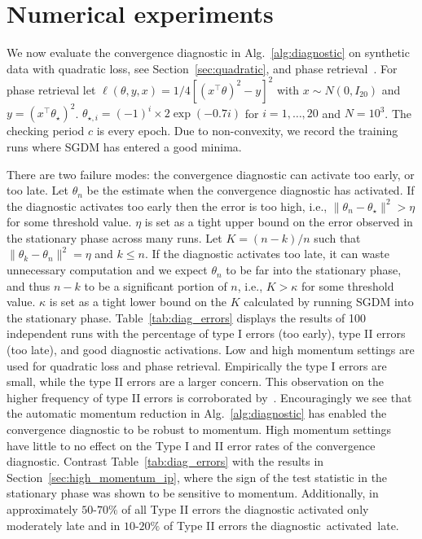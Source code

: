 \documentclass[conference]{IEEEtran}
\begin{document}
\section{Numerical experiments}\label{sec:synth-data-experiments}
We now evaluate the convergence diagnostic in Alg.~\ref{alg:diagnostic} on synthetic data with quadratic loss, see Section~\ref{sec:quadratic}, and phase retrieval~\cite{Article:Chen_MP19}.
For phase retrieval let $\ell ( \theta, y, x ) = 1/4 [ ( x^\top \theta )^2 - y ]^2$ with $x \sim N ( 0, I_{20} )$ and $y = ( x^\top \theta_\star )^2$.
$\theta_{\star,i} = (-1)^i \times 2 \exp( -0.7 i )$ for $i = 1, \dots, 20$ and $N = 10^3$.
The checking period $c$ is every epoch.
Due to non-convexity, we record the training runs where SGDM has entered a good minima.

There are two failure modes: the convergence diagnostic can activate too early, or too late.
Let $\theta_n$ be the estimate when the convergence diagnostic has activated.
If the diagnostic activates too early then the error is too high, i.e., $\| \theta_n - \theta_\star \|^2 > \eta$ for some threshold value.
$\eta$ is set as a tight upper bound on the error observed in the stationary phase across many runs. 
Let $K = (n - k) / n$ such that $\| \theta_k - \theta_n \|^2 = \eta$ and $k \leq n$.
If the diagnostic activates too late, it can waste unnecessary computation and we expect $\theta_n$ to be far into the stationary phase, and thus $n-k$ to be a significant portion of  $n$, i.e., $K > \kappa$ for some threshold value. $\kappa$ is set as a tight lower bound on the $K$ calculated by running SGDM  into the stationary phase.
Table~\ref{tab:diag_errors} displays the results of 100 independent runs with the percentage of type I errors (too early), type II errors (too late), and good diagnostic activations.
Low and high momentum settings are used for quadratic loss and phase retrieval.
Empirically the type I errors are small, while the type II errors are a larger concern.
This observation on the higher frequency of type II errors is corroborated by~\cite{Proc:Chee_AISTATS18}. Encouragingly we see that the automatic momentum reduction in Alg.~\ref{alg:diagnostic} has enabled the convergence diagnostic to be robust to momentum.
High momentum settings have little to no effect on the Type I and II error rates of the convergence diagnostic.
Contrast Table~\ref{tab:diag_errors} with the results in Section~\ref{sec:high_momentum_ip}, where the sign of the test statistic in the stationary phase was shown to be sensitive to momentum. 
Additionally, in approximately $50$-$70\%$ of all Type II errors the diagnostic activated only moderately late and in $10$-$20\%$ of Type II errors the diagnostic~activated~late.
\end{document}
